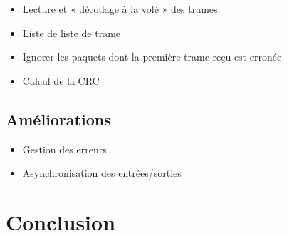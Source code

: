 \documentclass{beamer}
\begin{document}
\begin{frame}
    \begin{itemize}
        \item Lecture et « décodage à la volé » des trames
        \item Liste de liste de trame
        \item Ignorer les paquets dont la première trame reçu est erronée
        \item Calcul de la CRC
    \end{itemize}
\end{frame}

\subsection{Améliorations}

\begin{frame}
    \begin{itemize}
        \item Gestion des erreurs
        \item Asynchronisation des entrées/sorties
    \end{itemize}
\end{frame}

\section{Conclusion}
\end{document}
